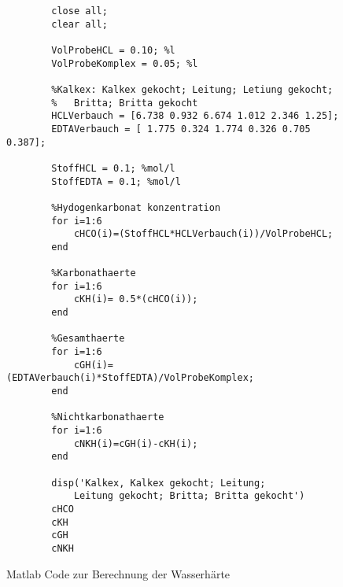 \documentclass[10pt,oneside,a4paper,fleqn]{article}
\begin{document}
	\begin{figure}[!h]
	\caption{Matlab Code zur Berechnung der Wasserhärte}
	\label{code:matlabFile}
	\begin{lstlisting}
		close all;
		clear all;
		
		VolProbeHCL = 0.10; %l
		VolProbeKomplex = 0.05; %l
		
		%Kalkex: Kalkex gekocht; Leitung; Letiung gekocht; 
		%	Britta; Britta gekocht
		HCLVerbauch = [6.738 0.932 6.674 1.012 2.346 1.25]; 
		EDTAVerbauch = [ 1.775 0.324 1.774 0.326 0.705 0.387];
		
		StoffHCL = 0.1; %mol/l
		StoffEDTA = 0.1; %mol/l
		
		%Hydogenkarbonat konzentration
		for i=1:6
		    cHCO(i)=(StoffHCL*HCLVerbauch(i))/VolProbeHCL;
		end
		
		%Karbonathaerte
		for i=1:6
		    cKH(i)= 0.5*(cHCO(i));
		end
		
		%Gesamthaerte
		for i=1:6
		    cGH(i)=(EDTAVerbauch(i)*StoffEDTA)/VolProbeKomplex;
		end
		
		%Nichtkarbonathaerte
		for i=1:6
		    cNKH(i)=cGH(i)-cKH(i);
		end
		
		disp('Kalkex, Kalkex gekocht; Leitung; 
			Leitung gekocht; Britta; Britta gekocht')
		cHCO
		cKH
		cGH
		cNKH
	\end{lstlisting}
	\end{figure}
\end{document}
